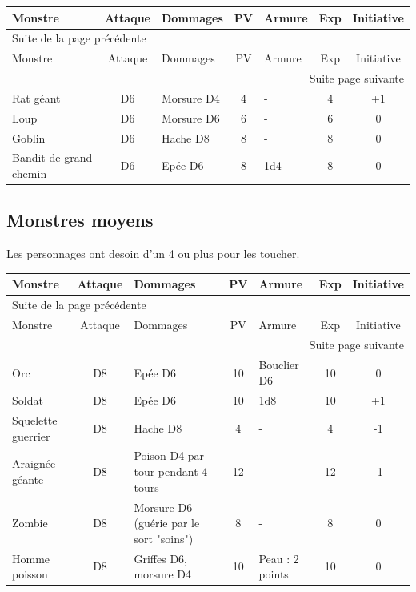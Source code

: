 \documentclass[a4paper, 11pt, twoside]{article}
\begin{document}
\begin{longtable}{p{3cm}|c|p{6cm}|c|p{1.3cm}|c|c}
Monstre & Attaque & Dommages & PV & Armure & Exp & Initiative\\
\hline
\endfirsthead
\multicolumn{7}{l}{Suite de la page précédente} \\
\hline

Monstre & Attaque & Dommages & PV & Armure & Exp & Initiative \\

\hline
\endhead
\hline\multicolumn{7}{r}{Suite page suivante} \\
\endfoot
\endlastfoot
\hline
Rat géant & D6 & Morsure D4 & 4 & - & 4 & +1\\
\hline
Loup & D6 & Morsure D6 & 6 & - & 6 & 0\\
\hline
Goblin & D6 & Hache D8 & 8 & - & 8 & 0\\
\hline
Bandit de grand chemin & D6 & Epée D6 & 8 & 1d4 & 8 & 0\\
\end{longtable}

\subsection{Monstres moyens}
\label{sec:orgec213e1}

Les personnages ont desoin d'un 4 ou plus pour les toucher.

\begin{longtable}{p{3cm}|c|p{6cm}|c|p{1.3cm}|c|c}
Monstre & Attaque & Dommages & PV & Armure & Exp & Initiative\\
\hline
\endfirsthead
\multicolumn{7}{l}{Suite de la page précédente} \\
\hline

Monstre & Attaque & Dommages & PV & Armure & Exp & Initiative \\

\hline
\endhead
\hline\multicolumn{7}{r}{Suite page suivante} \\
\endfoot
\endlastfoot
\hline
Orc & D8 & Epée D6 & 10 & Bouclier D6 & 10 & 0\\
\hline
Soldat & D8 & Epée D6 & 10 & 1d8 & 10 & +1\\
\hline
Squelette guerrier & D8 & Hache D8 & 4 & - & 4 & -1\\
\hline
Araignée géante & D8 & Poison D4 par tour pendant 4 tours & 12 & - & 12 & -1\\
\hline
Zombie & D8 & Morsure D6 (guérie par le sort "soins") & 8 & - & 8 & 0\\
\hline
Homme poisson & D8 & Griffes D6, morsure D4 & 10 & Peau : 2 points & 10 & 0\\
\end{longtable}
\end{document}
